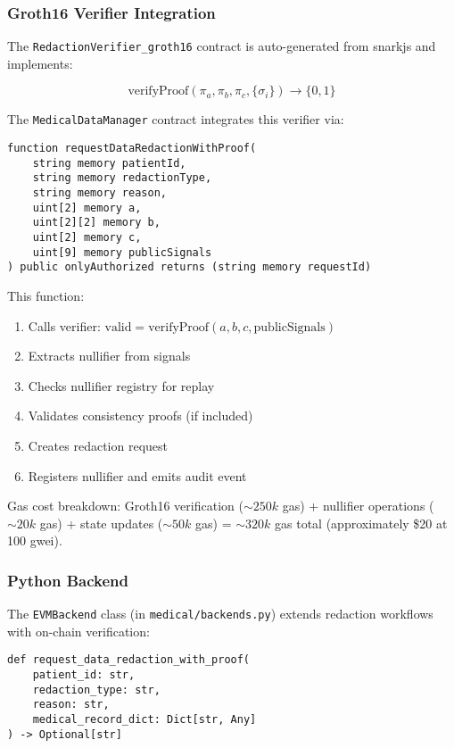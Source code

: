 \subsubsection{Groth16 Verifier Integration}

The \texttt{RedactionVerifier\_groth16} contract is auto-generated from snarkjs and implements:

\begin{equation}
    \text{verifyProof}(\pi_a, \pi_b, \pi_c, \{\sigma_i\}) \to \{0, 1\}
\end{equation}

The \texttt{MedicalDataManager} contract integrates this verifier via:

\begin{verbatim}
function requestDataRedactionWithProof(
    string memory patientId,
    string memory redactionType,
    string memory reason,
    uint[2] memory a,
    uint[2][2] memory b,
    uint[2] memory c,
    uint[9] memory publicSignals
) public onlyAuthorized returns (string memory requestId)
\end{verbatim}

This function:
\begin{enumerate}
    \item Calls verifier: $\text{valid} = \text{verifyProof}(a, b, c, \text{publicSignals})$
    \item Extracts nullifier from signals
    \item Checks nullifier registry for replay
    \item Validates consistency proofs (if included)
    \item Creates redaction request
    \item Registers nullifier and emits audit event
\end{enumerate}

Gas cost breakdown: Groth16 verification ($\sim 250k$ gas) + nullifier operations ($\sim 20k$ gas) + state updates ($\sim 50k$ gas) = $\sim 320k$ gas total (approximately \$20 at 100 gwei).

\subsubsection{Python Backend}

The \texttt{EVMBackend} class (in \texttt{medical/backends.py}) extends redaction workflows with on-chain verification:

\begin{verbatim}
def request_data_redaction_with_proof(
    patient_id: str,
    redaction_type: str,
    reason: str,
    medical_record_dict: Dict[str, Any]
) -> Optional[str]
\end{verbatim}

